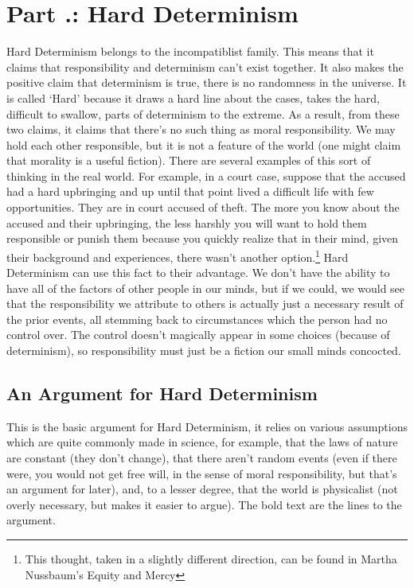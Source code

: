 \section{Part \thechapcount.\theseccount: Hard Determinism}

Hard Determinism belongs to the incompatiblist family. This means that it claims that responsibility and determinism can't exist together. It also makes the positive claim that determinism is true, there is no randomness in the universe. It is called `Hard' because it draws a hard line about the cases, takes the hard, difficult to swallow, parts of determinism to the extreme. As a result, from these two claims, it claims that there’s no such thing as moral responsibility. We may hold each other responsible, but it is not a feature of the world (one might claim that morality is a useful fiction). There are several examples of this sort of thinking in the real world. For example, in a court case, suppose that the accused had a hard upbringing and up until that point lived a difficult life with few opportunities. They are in court accused of theft. The more you know about the accused and their upbringing, the less harshly you will want to hold them responsible or punish them because you quickly realize that in their mind, given their background and experiences, there wasn't another option.\footnote{This thought, taken in a slightly different direction, can be found in Martha Nussbaum's Equity and Mercy} Hard Determinism can use this fact to their advantage. We don't have the ability to have all of the factors of other people in our minds, but if we could, we would see that the responsibility we attribute to others is actually just a necessary result of the prior events, all stemming back to circumstances which the person had no control over. The control doesn't magically appear in some choices (because of determinism), so responsibility must just be a fiction our small minds concocted.

\subsection{An Argument for Hard Determinism}
This is the basic argument for Hard Determinism, it relies on various assumptions which are quite commonly made in science, for example, that the laws of nature are constant (they don't change), that there aren't random events (even if there were, you would not get free will, in the sense of moral responsibility, but that's an argument for later), and, to a lesser degree, that the world is physicalist (not overly necessary, but makes it easier to argue).  The bold text are the lines to the argument.

